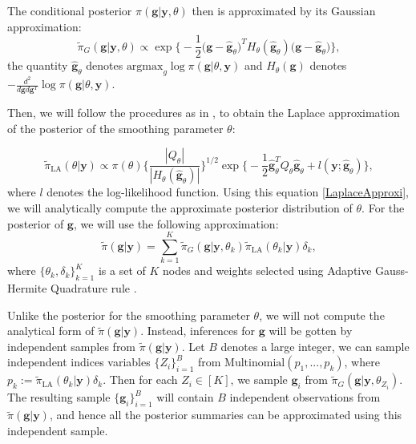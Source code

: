 \documentclass{article}
\begin{document}
The conditional posterior $\pi(\boldsymbol{g}|\boldsymbol{y},\theta)$ then is approximated by its Gaussian approximation:
\begin{equation}\label{GaussianApproxi}
\tilde{\pi}_G(\boldsymbol{g}|\boldsymbol{y},\theta) \propto \exp \bigg\{ -\frac{1}{2} \bigg(\boldsymbol{g} - \hat{\boldsymbol{g}}_\theta \bigg)^T H_\theta (\hat{\boldsymbol{g}}_\theta) \bigg(\boldsymbol{g} - \hat{\boldsymbol{g}}_\theta \bigg) \bigg\},
\end{equation}
the quantity $\hat{\boldsymbol{g}}_\theta$ denotes $\text{argmax}_g \log \pi (\boldsymbol{g} | \theta, \boldsymbol{y})$ and $H_\theta (\boldsymbol{g})$ denotes $-\frac{d^2}{d\boldsymbol{g}d\boldsymbol{g}^T} \log \pi(\boldsymbol{g} | \theta, \boldsymbol{y})$.

Then, we will follow the procedures as in \cite{tierney1986accurate}, to obtain the Laplace approximation of the posterior of the smoothing parameter $\theta$:

\begin{equation}\label{LaplaceApproxi}
\tilde{\pi}_\text{LA}(\theta|\boldsymbol{y}) \propto \pi(\theta) \bigg\{\frac{|Q_\theta|}{|H_\theta(\hat{\boldsymbol{g}}_\theta)|} \bigg\}^{1/2} \exp \bigg\{ -\frac{1}{2}  \hat{\boldsymbol{g}}_\theta^T Q_\theta  \hat{\boldsymbol{g}}_\theta + l(\boldsymbol{y};\hat{\boldsymbol{g}}_\theta) \bigg\},
\end{equation}
where $l$ denotes the log-likelihood function. Using this equation \ref{LaplaceApproxi}, we will analytically compute the approximate posterior distribution of $\theta$. For the posterior of $\boldsymbol{g}$, we will use the following approximation:
\begin{equation}\label{finalApproxi}
\tilde{\pi}(\boldsymbol{g}|\boldsymbol{y}) = \sum_{k=1}^K \tilde{\pi}_G(\boldsymbol{g}|\boldsymbol{y}, \theta_k) \tilde{\pi}_{\text{LA}}(\theta_k|\boldsymbol{y}) \delta_k,
\end{equation}
where $\{\theta_k, \delta_k\}_{k=1}^K$ is a set of $K$ nodes and weights selected using Adaptive Gauss-Hermite Quadrature rule \citep{aghq}.

Unlike the posterior for the smoothing parameter $\theta$, we will not compute the analytical form of $\tilde{\pi}(\boldsymbol{g}|\boldsymbol{y})$. Instead, inferences for $\boldsymbol{g}$ will be gotten by independent samples from $\tilde{\pi}(\boldsymbol{g}|\boldsymbol{y})$. Let $B$ denotes a large integer, we can sample independent indices variables $\{Z_i\}_{i=1}^B$ from $\text{Multinomial}(p_1,...,p_k)$, where $p_k := \tilde{\pi}_\text{LA}(\theta_k|\boldsymbol{y}) \delta_k$. Then for each $Z_i \in [K]$, we sample $\boldsymbol{g}_i$ from $\tilde{\pi}_G(\boldsymbol{g}|\boldsymbol{y},\theta_{Z_i})$. The resulting sample $\{\boldsymbol{g}_i\}_{i=1}^B$ will contain $B$ independent observations from $\tilde{\pi}(\boldsymbol{g}|\boldsymbol{y})$, and hence all the posterior summaries can be approximated using this independent sample. 
\end{document}
